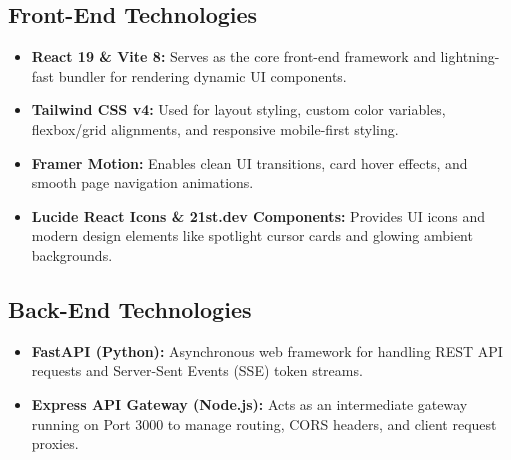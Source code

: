 \subsection{Front-End Technologies}
\begin{itemize}
    \item \textbf{React 19 \& Vite 8:} Serves as the core front-end framework and lightning-fast bundler for rendering dynamic UI components.
    \item \textbf{Tailwind CSS v4:} Used for layout styling, custom color variables, flexbox/grid alignments, and responsive mobile-first styling.
    \item \textbf{Framer Motion:} Enables clean UI transitions, card hover effects, and smooth page navigation animations.
    \item \textbf{Lucide React Icons \& 21st.dev Components:} Provides UI icons and modern design elements like spotlight cursor cards and glowing ambient backgrounds.
\end{itemize}

\subsection{Back-End Technologies}
\begin{itemize}
    \item \textbf{FastAPI (Python):} Asynchronous web framework for handling REST API requests and Server-Sent Events (SSE) token streams.
    \item \textbf{Express API Gateway (Node.js):} Acts as an intermediate gateway running on Port 3000 to manage routing, CORS headers, and client request proxies.
\end{itemize}
